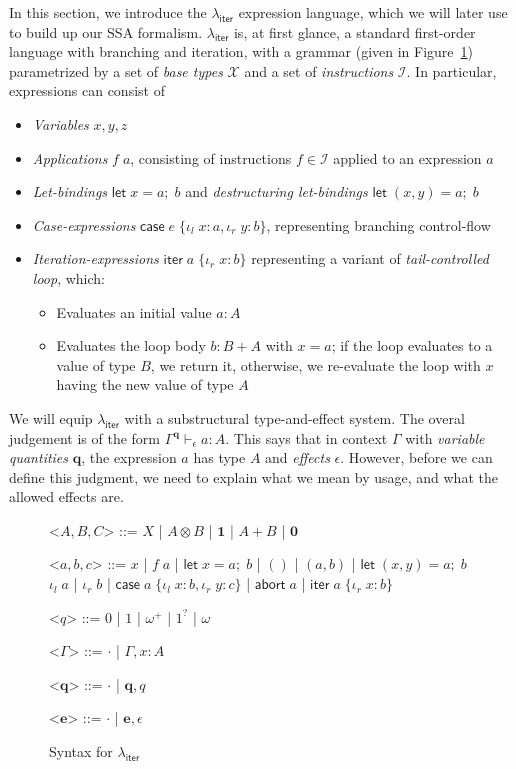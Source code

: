 \documentclass[acmsmall,screen,review]{acmart}
\newcommand{\mc}[1]{\ensuremath{\mathcal{#1}}}
\newcommand{\mb}[1]{\ensuremath{\mathbf{#1}}}
\newcommand{\ms}[1]{\ensuremath{\mathsf{#1}}}
\newcommand{\lto}{:}
\newcommand{\linl}[1]{\iota_l\;{#1}}
\newcommand{\linr}[1]{\iota_r\;{#1}}
\newcommand{\labort}[1]{\ms{abort}\;{#1}}
\newcommand{\letexpr}[3]{\ensuremath{\ms{let}\;#1 = #2;\;#3}}
\newcommand{\caseexpr}[5]{\ms{case}\;#1\;\{\linl{#2} \lto #3, \linr{#4} \lto #5\}}
\newcommand{\liter}[3]{\ms{iter}\;#1\;\{ \linr{#2} \lto #3 \}}
\newcommand{\hasty}[4]{#1 \vdash_{#2} #3: {#4}}
\newcommand{\subiterssa}{\(\lambda_{\ms{iter}}\)}
\newcommand{\zeroq}{0}
\newcommand{\oneq}{1}
\newcommand{\delq}{1^?}
\newcommand{\cpyq}{\omega^+}
\newcommand{\topq}{\omega}
\begin{document}
In this section, we introduce the \subiterssa{} expression language, which we will later use to
build up our SSA formalism. \subiterssa{} is, at first glance, a standard first-order language with
branching and iteration, with a grammar (given in Figure~\ref{fig:subiterssa-syntax})  parametrized
by a set of \emph{base types} $\mc{X}$ and a set of \emph{instructions} $\mc{I}$. In particular,
expressions can consist of
\begin{itemize}
  \item \emph{Variables} $x, y, z$
  \item \emph{Applications} $f\;a$, consisting of instructions $f \in \mc{I}$ applied to an
  expression $a$
  \item \emph{Let-bindings} $\letexpr{x}{a}{b}$ and \emph{destructuring let-bindings} $\letexpr{(x,
  y)}{a}{b}$
  \item \emph{Case-expressions} $\caseexpr{e}{x}{a}{y}{b}$, representing branching control-flow
  \item \emph{Iteration-expressions} $\liter{a}{x}{b}$ representing a variant of
  \emph{tail-controlled loop}, which:
  \begin{itemize}
    \item Evaluates an initial value $a : A$
    \item Evaluates the loop body $b : B + A$ with $x = a$; if the loop evaluates to a value of type
    $B$, we return it, otherwise, we re-evaluate the loop with $x$ having the new value of type $A$
  \end{itemize}
\end{itemize}


We will equip \subiterssa{} with a substructural type-and-effect system.
The overal judgement is of the form $\hasty{\Gamma^{\mb{q}}}{\epsilon}{a}{A}$. This says that in context $\Gamma$ with \emph{variable quantities} $\mb{q}$, the expression $a$ has type $A$ and \emph{effects} $\epsilon$. However, before we can define this judgment, we need to explain what we mean by usage, and what the allowed effects are. 

\begin{figure}
  \begin{grammar}
    <\(A, B, C\)> ::= 
    \(X\)
    \;|\; \(A \otimes B\)
    \;|\; \(\mathbf{1}\)
    \;|\; \(A + B\)
    \;|\; \(\mathbf{0}\)

    <\(a, b, c\)> ::=
    \(x\)
    \;|\; \(f\;a\)
    \;|\; \(\letexpr{x}{a}{b}\)
    \;|\; \(()\)
    \;|\; \((a, b)\)
    \;|\; \(\letexpr{(x, y)}{a}{b}\)
    \alt  \(\linl{a}\)
    \;|\; \(\linr{b}\)
    \;|\; \(\caseexpr{a}{x}{b}{y}{c}\)
    \;|\; \(\labort{a}\)
    \;|\; \(\liter{a}{x}{b}\)
    
    <\(q\)> ::= \(\zeroq\) | \(\oneq\) | \(\cpyq\) | \(\delq\) | \(\topq\)

    <\(\Gamma\)> ::= \(\cdot\) \;|\; \(\Gamma, x : A\)

    <\(\mb{q}\)> ::= \(\cdot\) \;|\; \(\mb{q}, q\)

    <\(\mb{e}\)> ::= \(\cdot\) \;|\; \(\mb{e}, \epsilon\)
  \end{grammar}
  \caption{Syntax for \subiterssa}
  \label{fig:subiterssa-syntax}
\end{figure}
\end{document}
